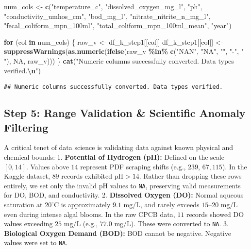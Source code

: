 \documentclass[
]{article}
\newenvironment{Shaded}{\begin{snugshade}}{\end{snugshade}}
\newcommand{\ConstantTok}[1]{\textcolor[rgb]{0.56,0.35,0.01}{#1}}
\newcommand{\ControlFlowTok}[1]{\textcolor[rgb]{0.13,0.29,0.53}{\textbf{#1}}}
\newcommand{\FunctionTok}[1]{\textcolor[rgb]{0.13,0.29,0.53}{\textbf{#1}}}
\newcommand{\NormalTok}[1]{#1}
\newcommand{\OtherTok}[1]{\textcolor[rgb]{0.56,0.35,0.01}{#1}}
\newcommand{\SpecialCharTok}[1]{\textcolor[rgb]{0.81,0.36,0.00}{\textbf{#1}}}
\newcommand{\StringTok}[1]{\textcolor[rgb]{0.31,0.60,0.02}{#1}}
\begin{document}
\begin{Shaded}
\begin{Highlighting}[]
\NormalTok{num\_cols }\OtherTok{\textless{}{-}} \FunctionTok{c}\NormalTok{(}\StringTok{"temperature\_c"}\NormalTok{, }\StringTok{"dissolved\_oxygen\_mg\_l"}\NormalTok{, }\StringTok{"ph"}\NormalTok{, }\StringTok{"conductivity\_umhos\_cm"}\NormalTok{,}
              \StringTok{"bod\_mg\_l"}\NormalTok{, }\StringTok{"nitrate\_nitrite\_n\_mg\_l"}\NormalTok{, }\StringTok{"fecal\_coliform\_mpn\_100ml"}\NormalTok{,}
              \StringTok{"total\_coliform\_mpn\_100ml\_mean"}\NormalTok{, }\StringTok{"year"}\NormalTok{)}

\ControlFlowTok{for}\NormalTok{ (col }\ControlFlowTok{in}\NormalTok{ num\_cols) \{}
\NormalTok{  raw\_v }\OtherTok{\textless{}{-}}\NormalTok{ df\_k\_step1[[col]]}
\NormalTok{  df\_k\_step1[[col]] }\OtherTok{\textless{}{-}} \FunctionTok{suppressWarnings}\NormalTok{(}\FunctionTok{as.numeric}\NormalTok{(}\FunctionTok{ifelse}\NormalTok{(raw\_v }\SpecialCharTok{\%in\%} \FunctionTok{c}\NormalTok{(}\StringTok{"NAN"}\NormalTok{, }\StringTok{"NA"}\NormalTok{, }\StringTok{""}\NormalTok{, }\StringTok{"{-}"}\NormalTok{, }\StringTok{" "}\NormalTok{), }\ConstantTok{NA}\NormalTok{, raw\_v)))}
\NormalTok{\}}
\FunctionTok{cat}\NormalTok{(}\StringTok{"Numeric columns successfully converted. Data types verified.}\SpecialCharTok{\textbackslash{}n}\StringTok{"}\NormalTok{)}
\end{Highlighting}
\end{Shaded}

\begin{verbatim}
## Numeric columns successfully converted. Data types verified.
\end{verbatim}

\subsection{Step 5: Range Validation \& Scientific Anomaly
Filtering}\label{step-5-range-validation-scientific-anomaly-filtering}

A critical tenet of data science is validating data against known
physical and chemical bounds: 1. \textbf{Potential of Hydrogen (pH):}
Defined on the scale \([0, 14]\). Values above \(14\) represent PDF
scraping shifts (e.g., \(239\), \(67,115\)). In the Kaggle dataset,
\(89\) records exhibited \(\text{pH} > 14\). Rather than dropping these
rows entirely, we set only the invalid pH values to \texttt{NA},
preserving valid measurements for DO, BOD, and conductivity. 2.
\textbf{Dissolved Oxygen (DO):} Normal aqueous saturation at
\(20^\circ\text{C}\) is approximately \(9.1\text{ mg/L}\), and rarely
exceeds \(15–20\text{ mg/L}\) even during intense algal blooms. In the
raw CPCB data, \(11\) records showed DO values exceeding
\(25\text{ mg/L}\) (e.g., \(77.0\text{ mg/L}\)). These were converted to
\texttt{NA}. 3. \textbf{Biological Oxygen Demand (BOD):} BOD cannot be
negative. Negative values were set to \texttt{NA}.
\end{document}
